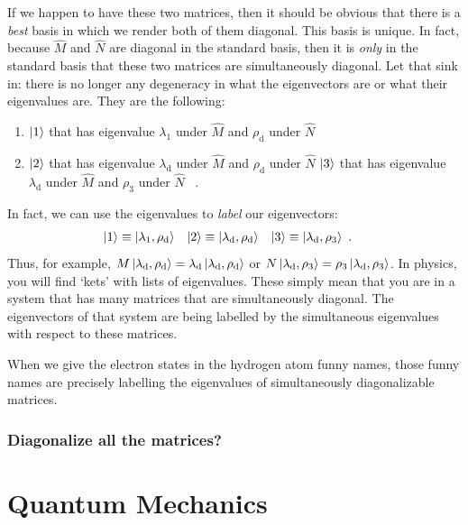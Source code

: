 \documentclass[12pt]{article}
\begin{document}
If we happen to have these two matrices, then it should be obvious that there is a \emph{best} basis in which we render both of them diagonal. This basis is unique. In fact, because $\hat M$ and $\hat N$ are diagonal in the standard basis, then it is \emph{only} in the standard basis that these two matrices are simultaneously diagonal. Let that sink in: there is no longer any degeneracy in what the eigenvectors are or what their eigenvalues are. They are the following:
\begin{enumerate}
    \item $\left|1\right\rangle$ that has eigenvalue $\lambda_1$ under $\hat M$ and $\rho_\text{d}$ under $\hat N$
    \item $\left|2\right\rangle$ that has eigenvalue $\lambda_\text{d}$ under $\hat M$ and $\rho_\text{d}$ under $\hat N$
    $\left|3\right\rangle$ that has eigenvalue $\lambda_\text{d}$ under $\hat M$ and $\rho_\text{3}$ under $\hat N$ \ .
\end{enumerate}
In fact, we can use the eigenvalues to \emph{label} our eigenvectors:
\begin{align}
    \left|1\right\rangle &\equiv \left|\lambda_1,\rho_\textnormal{d}\right\rangle
    &
    \left|2\right\rangle &\equiv \left|\lambda_\textnormal{d},\rho_\textnormal{d}\right\rangle
    &
    \left|3\right\rangle &\equiv \left|\lambda_\textnormal{d},\rho_3\right\rangle \ .
\end{align}
Thus, for example, $M\left|\lambda_\textnormal{d},\rho_\textnormal{d}\right\rangle = \lambda_\textnormal{d}\left|\lambda_\textnormal{d},\rho_\textnormal{d}\right\rangle$ or $N\left|\lambda_\textnormal{d},\rho_3\right\rangle = \rho_3\left|\lambda_\textnormal{d},\rho_3\right\rangle$.
In physics, you will find `kets' with lists of eigenvalues. These simply mean that you are in a system that has many matrices that are simultaneously diagonal. The eigenvectors of that system are being labelled by the simultaneous eigenvalues with respect to these matrices. 

\begin{example}
When we give the electron states in the hydrogen atom funny names, those funny names are precisely labelling the eigenvalues of simultaneously diagonalizable matrices.
\end{example}


\subsubsection*{Diagonalize all the matrices?}





\section{Quantum Mechanics}
\end{document}
